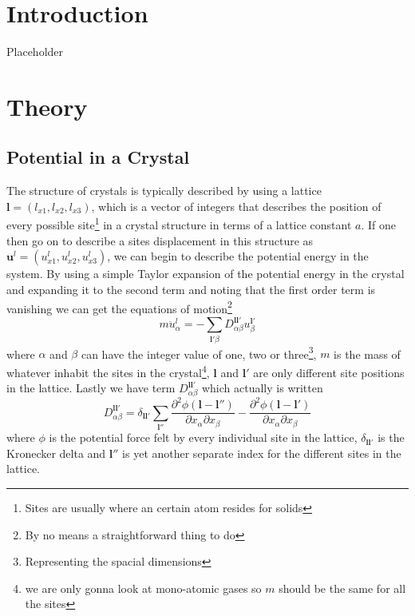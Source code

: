 \documentclass[11pt]{article}
\begin{document}
\section{Introduction}
Placeholder
\section{Theory}
\subsection{Potential in a Crystal}
The structure of crystals is typically described by using a lattice $\mathbf{l} = (l_{x1}, l_{x2}, l_{x3})$, which is a vector of integers that describes the position of every possible site\footnote{Sites are usually where an certain atom resides for solids} in a crystal structure in terms of a lattice constant $a$. If one then go on to describe a sites displacement in this structure as $\mathbf{u}^l = (u^l_{x1},u^l_{x2},u^l_{x3})$, we can begin to describe the potential energy in the system. By using a simple Taylor expansion of the potential energy in the crystal and expanding it to the second term and noting that the first order term is vanishing we can get the equations of motion\footnote{By no means a straightforward thing  to do} 
\begin{equation}
	m \ddot{u}^l_{\alpha} = - \sum_{\mathbf{l}'\beta} D^{\mathbf{l}\mathbf{l}'}_{\alpha \beta} u^{\mathbf{l}'}_{\beta}
	\label{eq:motion}
\end{equation}
where $\alpha$ and $\beta$ can have the integer value of one, two or three\footnote{Representing the spacial dimensions}, $m$ is the mass of whatever inhabit the sites in the crystal\footnote{we are only gonna look at mono-atomic gases so $m$ should be the same for all the sites}, $\mathbf{l}$ and $\mathbf{l}'$ are only different site positions in the lattice. Lastly we have term $D^{\mathbf{l}\mathbf{l}'}_{\alpha \beta}$ which actually is written
\begin{equation}
	D^{\mathbf{l}\mathbf{l}'}_{\alpha \beta} = \delta_{\mathbf{l} \mathbf{l}'} \sum_{\mathbf{l}''} \frac{\partial^2 \phi (\mathbf{l}-\mathbf{l}'')}{\partial x_{\alpha} \partial x_{\beta}}
	-
	\frac{\partial^2 \phi (\mathbf{l}-\mathbf{l}')}{\partial x_{\alpha} \partial x_{\beta}}
\end{equation}
where $\phi$ is the potential force felt by every individual site in the lattice, $\delta_{\mathbf{l}\mathbf{l}'}$ is the Kronecker delta and $\mathbf{l}''$ is yet another separate index for the different sites in the lattice.
\end{document}
